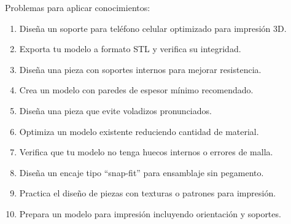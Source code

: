 Problemas para aplicar conocimientos:
\begin{enumerate}
	\item Diseña un soporte para teléfono celular optimizado
	      para impresión 3D.
	\item Exporta tu modelo a formato STL y verifica su
	      integridad.
	\item Diseña una pieza con soportes internos para
	      mejorar resistencia.
	\item Crea un modelo con paredes de espesor mínimo
	      recomendado.
	\item Diseña una pieza que evite voladizos pronunciados.
	\item Optimiza un modelo existente reduciendo cantidad
	      de material.
	\item Verifica que tu modelo no tenga huecos internos
	      o errores de malla.
	\item Diseña un encaje tipo ``snap-fit'' para ensamblaje
	      sin pegamento.
	\item Practica el diseño de piezas con texturas o
	      patrones para impresión.
	\item Prepara un modelo para impresión incluyendo
	      orientación y soportes.
\end{enumerate}